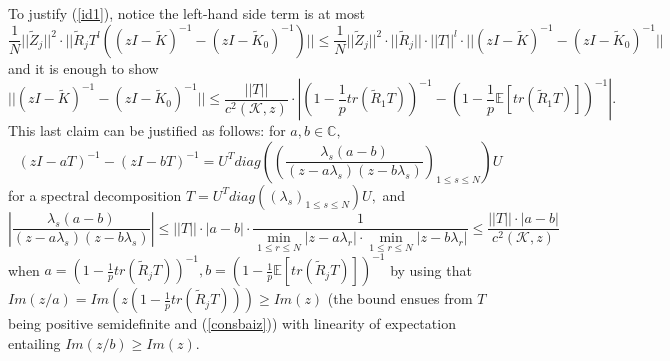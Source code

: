 \documentclass{article}
\numberwithin{equation}{section}
\begin{document}
To justify (\ref{id1}), notice the left-hand side term is at most%
\[\frac{1}{N}||\tilde{Z}_j||^2 \cdot ||\tilde{R}_jT^l((zI-\tilde{K})^{-1}-(zI-\tilde{K}_0)^{-1})|| \leq \frac{1}{N}||\tilde{Z}_j||^2 \cdot ||\tilde{R}_j|| \cdot ||T||^l \cdot ||(zI-\tilde{K})^{-1}-(zI-\tilde{K}_0)^{-1}||\]
and it is enough to show%
\[||(zI-\tilde{K})^{-1}-(zI-\tilde{K}_0)^{-1}|| \leq \frac{||T||}{c^2(\mathcal{K},z)} \cdot |(1-\frac{1}{p}tr(\tilde{R}_1T))^{-1}-(1-\frac{1}{p}\mathbb{E}[tr(\tilde{R}_1T)])^{-1}|.\]
This last claim can be justified as follows: for \(a,b \in \mathbb{C},\)
\[(zI-aT)^{-1}-(zI-bT)^{-1}=U^Tdiag((\frac{\lambda_s(a-b)}{(z-a\lambda_s)(z-b\lambda_s)})_{1 \leq s \leq N})U\] 
for a spectral decomposition \(T=U^Tdiag((\lambda_s)_{1 \leq s \leq N})U,\) and
\[|\frac{\lambda_s(a-b)}{(z-a\lambda_s)(z-b\lambda_s)}| \leq ||T|| \cdot |a-b| \cdot \frac{1}{\min_{1 \leq r \leq N}{|z-a\lambda_r|} \cdot \min_{1 \leq r \leq N}{|z-b\lambda_r|}} \leq \frac{||T|| \cdot |a-b|}{c^2(\mathcal{K},z)}\]
when \(a=(1-\frac{1}{p}tr(\tilde{R}_jT))^{-1},b=(1-\frac{1}{p}\mathbb{E}[tr(\tilde{R}_jT)])^{-1}\) by using that \(Im(z/a)=Im(z(1-\frac{1}{p}tr(\tilde{R}_jT)))\geq Im(z)\) (the bound ensues from \(T\) being positive semidefinite and (\ref{consbaiz})) with linearity of expectation entailing \(Im(z/b) \geq Im(z).\) %
\end{document}

